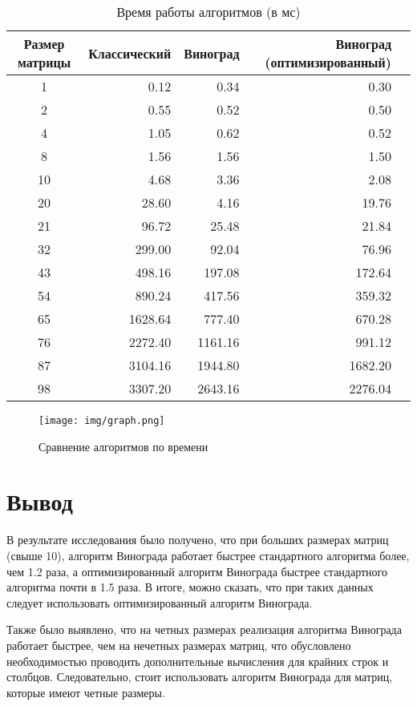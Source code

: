 \begin{table}[h]
	\begin{center}
		\begin{threeparttable}
		\captionsetup{justification=raggedright,singlelinecheck=off}
		\caption{Время работы алгоритмов (в мс)}
		\label{tbl:time_measurements}
		\begin{tabular}{|c|r|r|r|r|}
			\hline
			Размер матрицы &  Классический & Виноград & Виноград (оптимизированный) \\
            \hline
			1    & 0.12 & 0.34 & 0.30 \\
            \hline
			2    & 0.55 & 0.52 & 0.50 \\ 
            \hline
			4    & 1.05 & 0.62 & 0.52 \\ 
            \hline
			8    & 1.56 & 1.56 & 1.50 \\ 
			\hline
			10    & 4.68 & 3.36 & 2.08 \\ 
			\hline
			20    & 28.60 & 4.16 & 19.76 \\ 
			\hline
			21    & 96.72 & 25.48 & 21.84 \\ 
			\hline
			32    & 299.00 & 92.04 & 76.96 \\ 
			\hline
			43    & 498.16 & 197.08 & 172.64 \\ 
			\hline
			54    & 890.24 & 417.56 & 359.32 \\ 
			\hline
			65    & 1628.64 & 777.40 & 670.28 \\ 
			\hline
            76    & 2272.40 & 1161.16 & 991.12 \\ 
            \hline
            87    & 3104.16 & 1944.80 & 1682.20 \\ 
            \hline
            98   & 3307.20 & 2643.16 & 2276.04 \\ 
            \hline
		\end{tabular}
		\end{threeparttable}
    \end{center}
\end{table}

\begin{figure}[H]
    \centering
    \texttt{[image: img/graph.png]}
    \caption{Сравнение алгоритмов по времени}
    \label{fig:tm}
\end{figure}

\clearpage

\section{Вывод}

В результате исследования было получено, что при больших размерах матриц (свыше 10), алгоритм Винограда работает быстрее стандартного алгоритма более, чем 1.2 раза, а оптимизированный алгоритм Винограда быстрее стандартного алгоритма почти в 1.5 раза. В итоге, можно сказать, что при таких данных следует использовать оптимизированный алгоритм Винограда.

Также было выявлено, что на четных размерах реализация алгоритма Винограда работает быстрее, чем на нечетных размерах матриц, что обусловлено необходимостью проводить дополнительные вычисления для крайних строк и столбцов. Следовательно, стоит использовать алгоритм Винограда для матриц, которые имеют четные размеры.